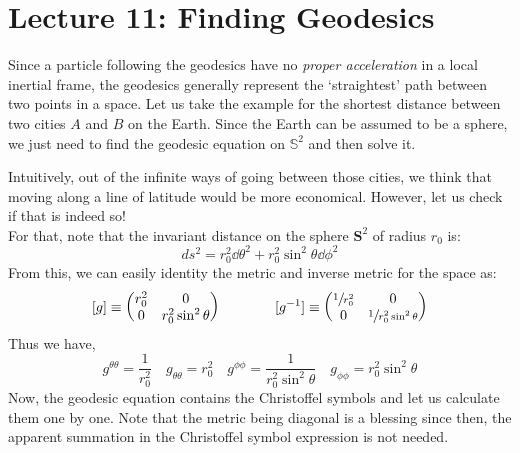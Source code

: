 \section*{Lecture 11: Finding Geodesics}
Since a particle following the geodesics have no \textit{proper acceleration} in a local inertial frame, the geodesics generally represent the `straightest' path between two points in a space. Let us take the example for the shortest distance between two cities $A$ and $B$ on the Earth. Since the Earth can be assumed to be a sphere, we just need to find the geodesic equation on $\mathbb{S}^2$ and then solve it.
\begin{figure}[H]
    \centering 
    
\end{figure}
\noindent
Intuitively, out of the infinite ways of going between those cities, we think that moving along a line of latitude would be more economical. However, let us check if that is indeed so!\\[0.2cm]
For that, note that the invariant distance on the sphere $\mathbf{S}^2$ of radius $r_0$ is:
$$ds^2 = r_0^2\dd\theta^2+r_0^2\sin^2\theta\dd\phi^2$$
From this, we can easily identity the metric and inverse metric for the space as:
$$[g]\equiv \mqty(r_0^2 & 0 \\ 0 & r_0^2\sin^2\theta)\qquad \qquad [g^{-1}]\equiv \mqty(\sfrac{1}{r_0^2} & 0 \\ 0 & \sfrac{1}{r_0^2\sin^2\theta})$$
Thus we have, $$g^{\theta\theta} = \frac{1}{r_0^2}\quad g_{\theta\theta} = {r_0^2} \quad g^{\phi\phi} = \frac{1}{r_0^2\sin^2\theta}\quad g_{\phi\phi} = {r_0^2\sin^2\theta}$$
Now, the geodesic equation contains the Christoffel symbols and let us calculate them one by one. Note that the metric being diagonal is a blessing since then, the apparent summation in the Christoffel symbol expression is not needed.
